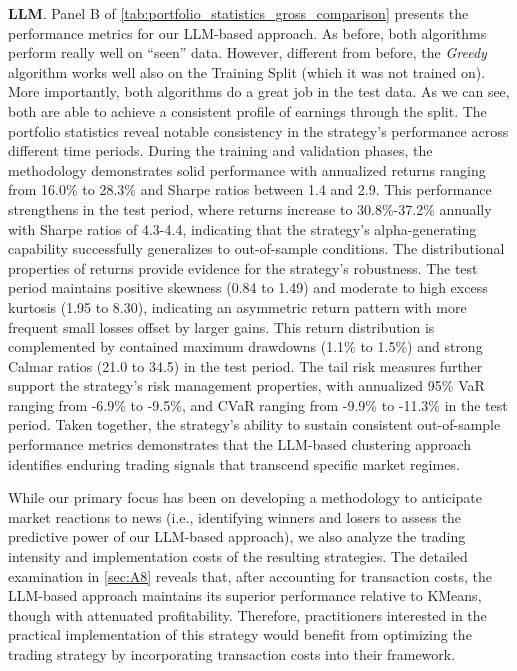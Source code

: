



\mx

\textbf{LLM}. 
Panel B of \cref{tab:portfolio_statistics_gross_comparison} presents the performance metrics for our LLM-based approach.
As before, both algorithms perform really well on ``seen'' data. However, different from before, the \textit{Greedy} algorithm works well also on the Training Split (which it was not trained on). More importantly, both algorithms do a great job in the test data. As we can see, both are able to achieve a consistent profile of earnings through the split. 
%
The portfolio statistics 
reveal notable consistency in the strategy's performance across different time periods. During the training and validation phases, the methodology demonstrates solid performance with annualized returns ranging from 16.0\% to 28.3\% and Sharpe ratios between 1.4 and 2.9. This performance strengthens in the test period, where returns increase to 30.8\%-37.2\% annually with Sharpe ratios of 4.3-4.4, indicating that the strategy's alpha-generating capability successfully generalizes to out-of-sample conditions. The distributional properties of returns provide evidence for the strategy's robustness. 
%
The test period maintains positive skewness (0.84 to 1.49) and moderate to high excess kurtosis (1.95 to 8.30), indicating an asymmetric return pattern with more frequent small losses offset by larger gains. This return distribution is complemented by contained maximum drawdowns (1.1\% to 1.5\%) and strong Calmar ratios (21.0 to 34.5) in the test period. The tail risk measures further support the strategy's risk management properties, with annualized 95\% VaR ranging from -6.9\% to -9.5\%, and CVaR ranging from -9.9\% to -11.3\% in the test period. 
%
Taken together, the strategy's ability to sustain consistent out-of-sample performance metrics demonstrates that the LLM-based clustering approach identifies enduring trading signals that transcend specific market regimes.


While our primary focus has been on developing a methodology to anticipate market reactions to news (i.e., identifying winners and losers to assess the predictive power of our LLM-based approach), we also analyze the trading intensity and implementation costs of the resulting strategies. The detailed examination in \ref{sec:A8} reveals that, 
after accounting for transaction costs, the LLM-based approach maintains its superior performance relative to KMeans, though with attenuated profitability. Therefore, practitioners interested in the practical implementation of this strategy would benefit from optimizing the trading strategy by incorporating transaction costs into their framework.


